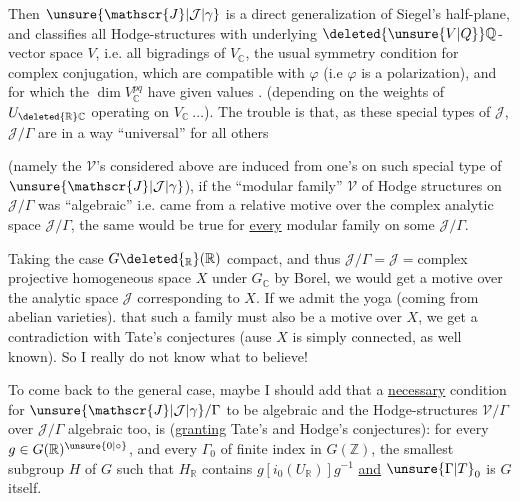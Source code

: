 Then $\unsure{\mathscr{J}|\mathcal{J}|\gamma}$ is a direct generalization of Siegel's half-plane, and classifies all Hodge-structures  with underlying $\deleted{\unsure{V|Q}}\mathbb{Q}$-vector space $V$,  i.e. all bigradings of $V_{\mathbb{C}}$,   the usual symmetry condition for complex conjugation, which are compatible with $\varphi$ (i.e $\varphi$ is a polarization), and for which the $\dim V_{\mathbb{C}}^{pq}$ have given values . (depending on the weights of $U_{\deleted{\mathbb{R}}\mathbb{C}}$ operating on $V_{\mathbb{C}}\ \ldots$). The trouble is that,  as these special types of $\mathscr{J}$, $\mathscr{J}/\Gamma$ are in a way ``universal'' for all others


(namely the $\mathscr{V}$'s considered above are induced from one's on such special type of $\unsure{\mathscr{J}|\mathcal{J}|\gamma}$), if the ``modular family'' $\mathscr{V}$ of Hodge structures on  $\mathscr{J}/\Gamma$ was ``algebraic'' i.e. came from a relative motive over the complex analytic space $\mathscr{J}/\Gamma$,  the same would be true for \uline{every} modular family on some $\mathscr{J}/\Gamma$.

Taking the case $G\deleted{_{\mathbb{R}}}(\mathbb{R})$ compact,  and thus $\mathscr{J}/\Gamma=\mathscr{J}={}$complex projective homogeneous space $X$ under $G_{\mathbb{C}}$ by Borel, we would get a  motive over the analytic space $\mathscr{J}$ corresponding to $X$. If we admit the  yoga (coming from  abelian varieties). that such a family must also be a motive over $X$,  we  get a contradiction with Tate's conjectures  (ause $X$ is simply connected, as well known). So I really do not know what to believe!



To come back to the general case, maybe I should add that a \uline{necessary} condition for $\unsure{\mathscr{J}|\mathcal{J}|\gamma}/\Gamma$ to be algebraic and the Hodge-structures $\mathscr{V}/\Gamma$ over $\mathscr{J}/\Gamma$ algebraic too, is (\uline{granting} Tate's and Hodge's conjectures): for every $g\in G(\mathbb{R})^{\unsure{0|\circ}}$, and every $\Gamma_0$ of finite index in $G(\mathbb{Z})$, the smallest  subgroup $H$ of $G$ such that $H_{\mathbb{R}}$ contains $g[i_0(U_{\mathbb{R}})]g^{-1}$ \uline{and} $\unsure{\Gamma|T}_0$ is $G$ itself.

